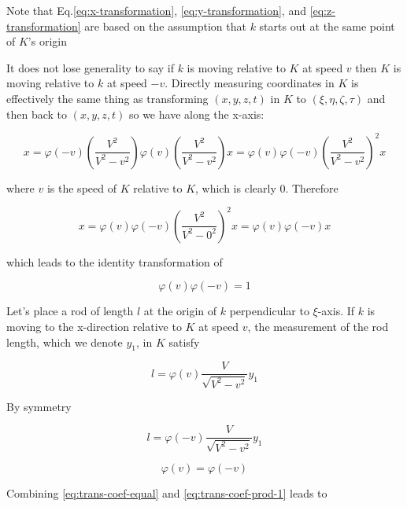 Note that Eq.\ref{eq:x-transformation}, \ref{eq:y-transformation}, and \ref{eq:z-transformation} are based on the
assumption that $k$ starts out at the same point of $K$'s origin

It does not lose generality to say if $k$ is moving relative to $K$ at speed $v$ then $K$ is moving relative to $k$ at
speed $-v$. Directly measuring coordinates in $K$ is effectively the same thing as transforming $(x, y, z, t)$ in $K$
to $(\xi, \eta, \zeta, \tau)$ and then back to $(x, y, z, t)$ so we have along the x-axis:

\begin{equation}
    x = \varphi(-v)\left( \frac{V^2}{V^2 - v^2} \right) \varphi(v)\left( \frac{V^2}{V^2 - v^2} \right) x = \varphi(v)\varphi(-v)\left( \frac{V^2}{V^2 - v^2} \right)^2 x
\end{equation}

where $v$ is the speed of $K$ relative to $K$, which is clearly 0. Therefore

\begin{equation}
    x = \varphi(v)\varphi(-v)\left( \frac{V^2}{V^2 - 0^2} \right)^2 x = \varphi(v)\varphi(-v) x
\end{equation}

which leads to the identity transformation of

\begin{equation}\label{eq:trans-coef-prod-1}
\varphi(v)\varphi(-v) = 1
\end{equation}

Let's place a rod of length $l$ at the origin of $k$ perpendicular to $\xi$-axis. If $k$ is moving to the x-direction
relative to $K$ at speed $v$, the measurement of the rod length, which we denote $y_1$, in $K$ satisfy

\begin{equation}
    l = \varphi(v)\frac{V}{\sqrt{V^2 - v^2}}y_1
\end{equation}

By symmetry

\begin{equation}
    l = \varphi(-v)\frac{V}{\sqrt{V^2 - v^2}}y_1
\end{equation}

\begin{equation}\label{eq:trans-coef-equal}
\varphi(v) = \varphi(-v)
\end{equation}

Combining \ref{eq:trans-coef-equal} and \ref{eq:trans-coef-prod-1} leads to


